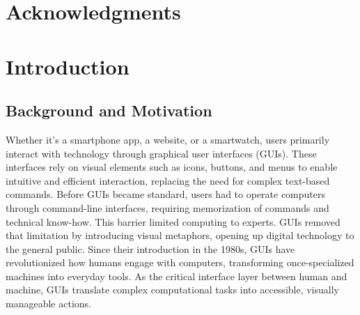 \documentclass[openany]{book}
\begin{document}
\chapter*{Acknowledgments}
\tableofcontents
\listoffigures
\listoftables

\glsaddall
\printglossary[type=\acronymtype, title=List of Abbreviations]

\chapter{Introduction}
\section{Background and Motivation}
Whether it's a smartphone app, a website, or a smartwatch, users primarily interact with technology through graphical user interfaces (GUIs). These interfaces rely on visual elements such as icons, buttons, and menus to enable intuitive and efficient interaction, replacing the need for complex text-based commands.
Before GUIs became standard, users had to operate computers through command-line interfaces, requiring memorization of commands and technical know-how. This barrier limited computing to experts. GUIs removed that limitation by introducing visual metaphors, opening up digital technology to the general public.
Since their introduction in the 1980s, GUIs have revolutionized how humans engage with computers, transforming once-specialized machines into everyday tools. As the critical interface layer between human and machine, GUIs translate complex computational tasks into accessible, visually manageable actions.
\end{document}
